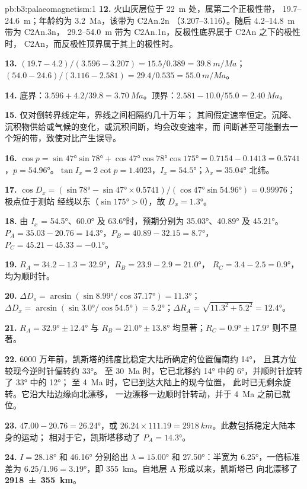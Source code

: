 \begin{solution}{pb:b3:palaeomagnetism:1}
\textbf{12.} 火山灰层位于 \qty{22}{m} 处，属第二个正极性带，
19.7--\qty{24.6}{m}；年龄约为 \qty{3.2}{Ma}，该带为 C2An.2n
（3.207--3.116）。随后 4.2--\qty{14.8}{m} 带为 C2An.3n，
29.2--\qty{54.0}{m} 带为 C2An.1n，反极性底界属于 C2An 之下的极性时，
C2An，而反极性顶界属于其上的极性时。

\textbf{13.} $(19.7 - 4.2)/(3.596 - 3.207) = 15.5/0.389 = \qty{39.8}{m/Ma}$；
$(54.0 - 24.6)/(3.116 - 2.581) = 29.4/0.535 = \qty{55.0}{m/Ma}$。

\textbf{14.} 底界：$3.596 + 4.2/39.8 = \qty{3.70}{Ma}$。顶界：$2.581 -
10.0/55.0 = \qty{2.40}{Ma}$。

\textbf{15.} 仅对倒转界线定年，界线之间相隔约几十万年；
其间假定速率恒定。沉降、
沉积物供给或气候的变化，或沉积间断，均会改变速率，而
间断甚至可能删去一个短的带，致使对比产生误导。

\textbf{16.} $\cos p = \sin\ang{47}\sin\ang{78} + \cos\ang{47}\cos\ang{78}
\cos\ang{175} = 0.7154 - 0.1413 = 0.5741$，$p = \ang{54.96}$。$\tan I_x =
2\cot p = 1.4023$，$I_x = \ang{54.5}$；$\lambda_x = \ang{35.04}$ 北纬。

\textbf{17.} $\cos D_x = (\sin\ang{78} - \sin\ang{47}\times0.5741)/
(\cos\ang{47}\sin\ang{54.96}) = 0.99976$；极点位于测站
经线以东（$\sin\ang{175} > 0$），故 $D_x = \ang{1.3}$。

\textbf{18.} 由 $I_x$ = \ang{54.5}、\ang{60.0} 及
\ang{63.6}时，预期分别为 \ang{35.03}、\ang{40.89} 及 \ang{45.21}。$P_A = 35.03 - 20.76 =
\ang{14.3}$，$P_B = 40.89 - 32.15 = \ang{8.7}$，$P_C = 45.21 - 45.33 =
\ang{-0.1}$。

\textbf{19.} $R_A = 34.2 - 1.3 = \ang{32.9}$，$R_B = 23.9 - 2.9 = \ang{21.0}$，
$R_C = 3.4 - 2.5 = \ang{0.9}$，均为顺时针。

\textbf{20.} $\Delta D_o = \arcsin(\sin\ang{8.99}/\cos\ang{37.17}) = \ang{11.3}$；
$\Delta D_x = \arcsin(\sin\ang{3.0}/\cos\ang{54.5}) = \ang{5.2}$；$\Delta R_A =
\sqrt{11.3^2 + 5.2^2} = \ang{12.4}$。

\textbf{21.} $R_A = \ang{32.9} \pm \ang{12.4}$ 与 $R_B = \ang{21.0} \pm
\ang{13.8}$ 均显著；$R_C = \ang{0.9} \pm \ang{17.9}$ 则不显著。

\textbf{22.} 6000 万年前，凯斯塔的纬度比稳定大陆所确定的位置偏南约 \ang{14}，
且其方位较现今逆时针偏转约 \ang{33}。
至 \qty{30}{Ma} 时，它已北移约 \ang{14} 中的
\ang{6}，并顺时针旋转了 \ang{33} 中的 \ang{12}；
至 \qty{4}{Ma} 时，它已到达大陆上的现今位置，
此时已无剩余旋转。它沿大陆边缘向北漂移，
一边漂移一边顺时针转动，并于 \qty{4}{Ma} 之前已就位。

\textbf{23.} $47.00 - 20.76 = \ang{26.24}$，或 $26.24\times111.19 =
\qty{2918}{km}$。此数包括稳定大陆本身的运动；
相对于它，凯斯塔移动了 $P_A = \ang{14.3}$。

\textbf{24.} $I = \ang{28.18}$ 和 \ang{46.16} 分别给出 $\lambda = \ang{15.00}$ 和
\ang{27.50}：半宽为 \ang{6.25}，一倍标准差为
$6.25/1.96 = \ang{3.19}$，即 \qty{355}{km}。自地层 A 形成以来，凯斯塔已
向北漂移了
\textbf{\qty[text-series-to-math=true]{2918 \pm 355}{km}}。
\end{solution}
